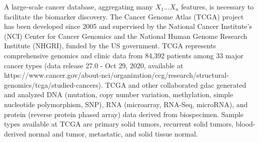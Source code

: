 \documentclass[jpm,article,submit,moreauthors,pdftex]{Definitions/mdpi}
\newenvironment{MyColorPar}[1]{%
    \leavevmode\color{#1}\ignorespaces%
}{%
}%
\begin{document}
A large-scale cancer database, aggregating many $X_1 ... X_n$ features, is necessary to facilitate the biomarker discovery.
The Cancer Genome Atlas (TCGA) project\cite{Weinstein2013} has been developed since 2005 and supervised by the National Cancer Institute's (NCI) Center for Cancer Genomics and the National Human Genome Research Institute (NHGRI), funded by the US government.
TCGA represents comprehensive genomics and clinic data from 84,392 patients among 33 major cancer types (data release 27.0 - Oct 29, 2020, available at https://www.cancer.gov/about-nci/organization/ccg/research/structural-genomics/tcga/studied-cancers).
TCGA and other collaborated \acrfull{gdac} generated and analyzed DNA (mutation, copy number variation, methylation, simple nucleotide polymorphism, SNP), RNA (microarray, RNA-Seq, microRNA), and protein (reverse protein phased array) data derived from biospecimen. Sample types available at TCGA are primary solid tumors, recurrent solid tumors, blood-derived normal and tumor, metastatic, and solid tissue normal.  
\end{document}
